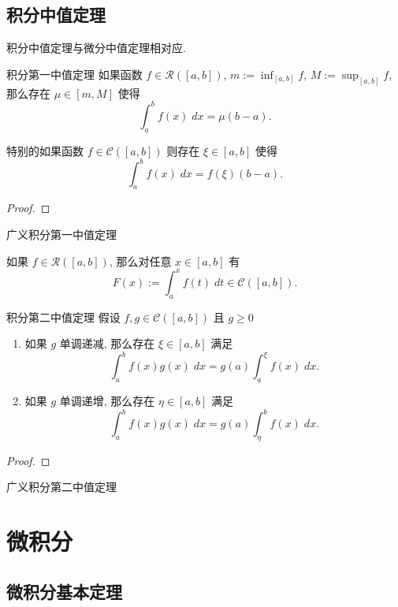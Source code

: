 \documentclass[cn,toc=twocol]{elegantbook}
\newcommand{\ITEMS}{\begin{enumerate}}
\newcommand{\ITEME}{\end{enumerate}}
\newcommand{\ds}{\displaystyle}
\begin{document}
\subsection{积分中值定理}

积分中值定理与微分中值定理相对应.

\begin{theorem}{积分第一中值定理}
	如果函数 $f \in \mathscr{R}([a,b])$, $\ds m := \inf_{[a,b]} f$, $\ds M := \sup_{[a,b]} f$, 那么存在 $\mu \in [m,M]$ 使得
	\[
		\int_a^b f(x)\;dx = \mu(b-a).
	\]
	\smallskip
	
	特别的如果函数 $f \in \mathscr{C}([a,b])$ 则存在 $\xi \in [a,b]$ 使得
	\[
		\int_a^b f(x)\;dx = f(\xi)(b-a).
	\]
\end{theorem}
\begin{proof}
\end{proof}

\begin{theorem}{广义积分第一中值定理}
	
\end{theorem}


\begin{lemma}
	如果 $f \in \mathscr{R}([a,b])$, 那么对任意 $x \in [a,b]$ 有
	\[
		F(x) := \int_a^x f(t)\;dt \in \mathscr{C}([a,b]).
	\]
\end{lemma}


\begin{theorem}{积分第二中值定理}
	假设 $f,g \in \mathscr{C}([a,b])$ 且 $g \ge 0$
	\ITEMS
		\item 如果 $g$ 单调递减, 那么存在 $\xi \in [a,b]$ 满足
		\[
			\int_a^b f(x) g(x)\;dx = g(a) \int_a^\xi f(x)\;dx.
		\]
		\item 如果 $g$ 单调递增, 那么存在 $\eta \in [a,b]$ 满足
		\[
			\int_a^b f(x) g(x)\;dx = g(a) \int_\eta^b f(x)\;dx.
		\]
	\ITEME
\end{theorem}
\begin{proof}
\end{proof}


\begin{theorem}{广义积分第二中值定理}
	
\end{theorem}



\section{微积分}

\subsection{微积分基本定理}
\end{document}
